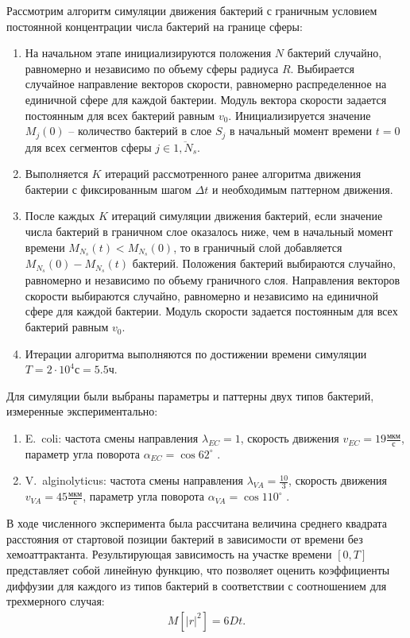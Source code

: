Рассмотрим алгоритм симуляции движения бактерий с граничным условием постоянной концентрации числа бактерий на границе сферы:
\begin{enumerate}
    \item На начальном этапе инициализируются положения $N$ бактерий случайно, равномерно и независимо по объему сферы радиуса $R$. Выбирается случайное направление векторов скорости, равномерно распределенное на единичной сфере для каждой бактерии. Модуль вектора скорости задается постоянным для всех бактерий равным $v_0$. Инициализируется значение $M_j (0)$ -- количество бактерий в слое $S_j$ в начальный момент времени $t=0$ для всех сегментов сферы $j \in \overline{1,N_s}$.
    \item Выполняется $K$ итераций рассмотренного ранее алгоритма движения бактерии с фиксированным шагом $\Delta t$ и необходимым паттерном движения.
    \item После каждых $K$ итераций симуляции движения бактерий, если значение числа бактерий в граничном слое оказалось ниже, чем в начальный момент времени $M_{N_s}(t) < M_{N_s}(0)$, то в граничный слой добавляется $M_{N_s}(0) - M_{N_s}(t)$ бактерий. Положения бактерий выбираются случайно, равномерно и независимо по объему граничного слоя. Направления векторов скорости выбираются случайно, равномерно и независимо на единичной сфере для каждой бактерии. Модуль скорости задается постоянным для всех бактерий равным $v_0$.
    \item Итерации алгоритма выполняются по достижении времени симуляции $T = 2 \cdot 10^4 \textrm{с} = 5.5 \textrm{ч}$.
\end{enumerate}

Для симуляции были выбраны параметры и паттерны двух типов бактерий, измеренные экспериментально: 
\begin{enumerate}
    \item E.~coli: частота смены направления $\lambda_{EC}=1$, скорость движения $v_{EC}=19 \frac{\textrm{мкм}}{\textrm{с}}$, параметр угла поворота $\alpha_{EC}=\cos 62^\circ$ \cite{berg_chemotaxis_1972}.
    \item V.~alginolyticus: частота смены направления $\lambda_{VA}=\frac{10}{3}$, скорость движения $v_{VA}=45 \frac{\textrm{мкм}}{\textrm{с}}$, параметр угла поворота $\alpha_{VA}=\cos 110^\circ$ \cite{xie_bacterial_2011}.
\end{enumerate}


В ходе численного эксперимента была рассчитана величина среднего квадрата расстояния от стартовой позиции бактерий в зависимости от времени без хемоаттрактанта. Результирующая зависимость на участке времени $[0, T]$ представляет собой линейную функцию, что позволяет оценить коэффициенты диффузии для каждого из типов бактерий в соответствии с соотношением для трехмерного случая:
\begin{equation}
    \begin{aligned}
        M\left [|r|^2 \right ]=6Dt.
    \label{eq:msd}
    \end{aligned}
\end{equation}

